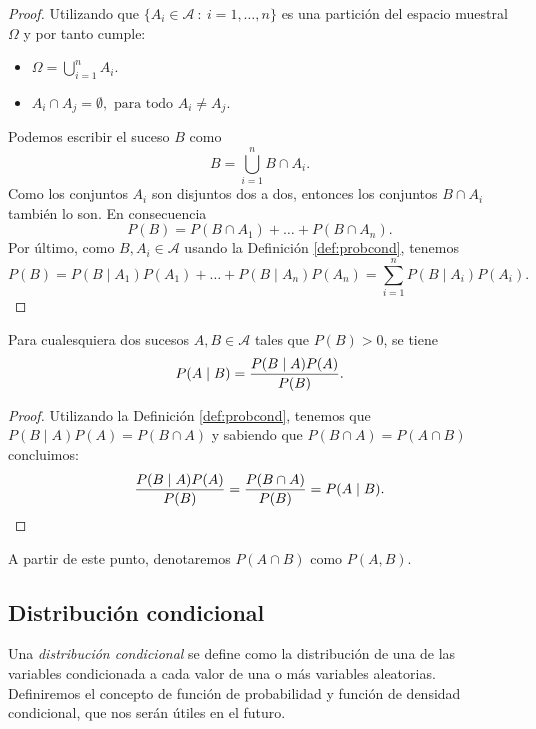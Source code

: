 \documentclass[oneside,openright,titlepage,numbers=noenddot,openany,headinclude,footinclude=true,
cleardoublepage=empty,abstractoff,BCOR=5mm,paper=a4,fontsize=12pt,main=spanish]{scrreprt}
\begin{document}
\begin{proof}
Utilizando que $\{A_i\in \mathcal{A} \ : \ i=1,\dots,n\}$ es una partición del espacio muestral $\Omega$ y por tanto cumple: 

\begin{itemize}
    \item $\displaystyle \Omega=\bigcup_{i=1}^n A_i$.
    \item $\displaystyle A_i \cap A_j = \emptyset, \text{ para todo } A_i\neq A_j.$
\end{itemize}

Podemos escribir el suceso $B$ como $$B=\bigcup_{i=1}^n B \cap A_i.$$ 
Como los conjuntos $A_i$ son disjuntos dos a dos, entonces los conjuntos $B\cap A_i$ también lo son. En consecuencia $$P(B)= P(B\cap A_1)+\dots+P(B\cap A_n).$$
Por último, como $B,A_i\in \mathcal{A}$ usando la Definición \ref{def:probcond}, tenemos $$P(B)=P(B \mid A_1) P(A_1)+\dots+P(B \mid A_n) P(A_n)=\sum_{i=1}^n P(B \mid A_i) P(A_i).$$
\end{proof}

\begin{theorem} \label{th:bayes}
Para cualesquiera dos sucesos $A,B \in \mathcal{A}$ tales que $P(B)>0$, se tiene $$P(A \mid B)=\frac{\displaystyle P(B \mid A) P(A)}{\displaystyle P(B)}.$$
\end{theorem}

\begin{proof}
 Utilizando la Definición \ref{def:probcond}, tenemos que $P(B \mid A) P(A)=P(B\cap A)$ y sabiendo que $P(B \cap A)=P(A \cap B)$ concluimos: $$\frac{\displaystyle P(B \mid A) P(A)}{\displaystyle P(B)}=\frac{\displaystyle P(B \cap A)}{\displaystyle P(B)}=P(A \mid B).$$
\end{proof}

\begin{notation}
A partir de este punto, denotaremos $P(A\cap B)$ como $P(A,B)$.
\end{notation}

\subsection{Distribución condicional}

Una \textit{distribución condicional} se define como la distribución de una de las variables condicionada a cada valor de una o más variables aleatorias. Definiremos el concepto de función de probabilidad y función de densidad condicional, que nos serán útiles en el futuro.\\
\end{document}
